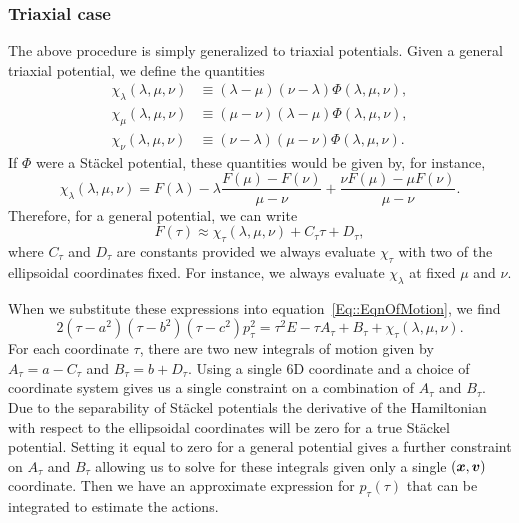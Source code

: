 \documentclass[useAMS,usenatbib,fleqn,a4paper]{mn2e}
\newcommand{\bs}[1]{\bmath{#1}}
\begin{document}
\subsubsection{Triaxial case}\label{Method::SF_Triax}
The above procedure is simply generalized to triaxial potentials. Given a general triaxial potential, we define the quantities
\begin{equation}
\begin{split}
\chi_\lambda(\lambda,\mu,\nu) &\equiv (\lambda-\mu)(\nu-\lambda)\Phi(\lambda,\mu,\nu),\\
\chi_\mu(\lambda,\mu,\nu) &\equiv (\mu-\nu)(\lambda-\mu)\Phi(\lambda,\mu,\nu),\\
\chi_\nu(\lambda,\mu,\nu) &\equiv (\nu-\lambda)(\mu-\nu)\Phi(\lambda,\mu,\nu).
\end{split}
\end{equation}
If $\Phi$ were a St\"ackel potential, these quantities would be given by, for instance,
\begin{equation}
\chi_\lambda(\lambda,\mu,\nu) = F(\lambda)-\lambda\frac{F(\mu)-F(\nu)}{\mu-\nu}+\frac{\nu F(\mu)-\mu F(\nu)}{\mu-\nu}.
\end{equation}
Therefore, for a general potential, we can write
\begin{equation}
F(\tau) \approx \chi_\tau(\lambda,\mu,\nu)+C_\tau\tau+D_\tau,
\end{equation}
where $C_\tau$ and $D_\tau$ are constants provided we always evaluate
$\chi_\tau$ with two of the ellipsoidal coordinates fixed. For instance, we
always evaluate $\chi_\lambda$ at fixed $\mu$ and $\nu$.

When we substitute these expressions into equation~\eqref{Eq::EqnOfMotion}, we find
\begin{equation}
2(\tau-a^2)(\tau-b^2)(\tau-c^2)p_\tau^2=\tau^2 E -\tau A_\tau+B_\tau +\chi_\tau(\lambda,\mu,\nu).
\label{Eq::EqnOfMotion_JK}
\end{equation}
For each coordinate $\tau$, there are two new integrals of motion given by
$A_\tau=a-C_\tau$ and $B_\tau=b+D_\tau$. Using a single 6D coordinate and a
choice of coordinate system gives us a single constraint on a combination of
$A_\tau$ and $B_\tau$. Due to the separability of St\"ackel potentials the
derivative of the Hamiltonian with respect to the ellipsoidal coordinates
will be zero for a true St\"ackel potential. Setting it equal to zero for a
general potential gives a further constraint on $A_\tau$ and $B_\tau$ allowing
us to solve for these integrals given only a single $(\bs{x},\bs{v})$
coordinate. Then we have an approximate expression for $p_\tau(\tau)$ that
can be integrated to estimate the actions.
\end{document}
